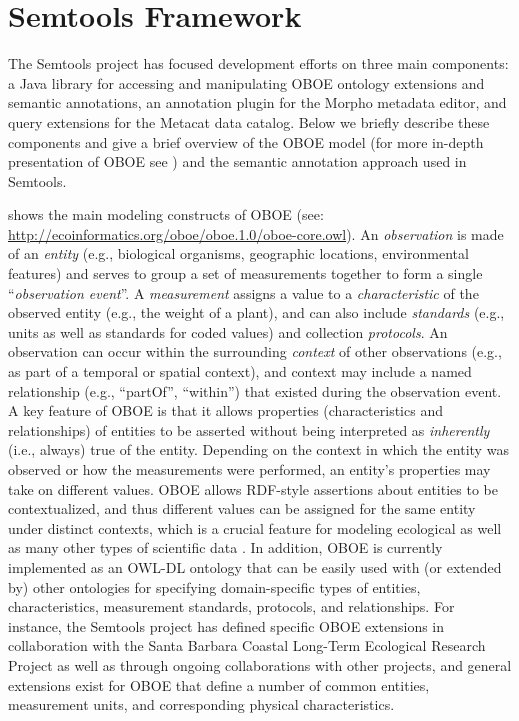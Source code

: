 \section{Semtools Framework}
\label{sec:framework}

The Semtools project has focused development efforts on three main
components: a Java library for accessing and manipulating OBOE
ontology extensions and semantic annotations, an annotation plugin for
the Morpho metadata editor, and query extensions for the Metacat data
catalog. Below we briefly describe these components and give a brief
overview of the OBOE model (for more in-depth presentation of OBOE see
\cite{madin07:_ontol_for_descr_and_synth,bowers08}) and the semantic
annotation approach used in Semtools.


   shows the
main modeling constructs of OBOE (see:
\url{http://ecoinformatics.org/oboe/oboe.1.0/oboe-core.owl}). An {\em
  observation} is made of an {\em entity} (e.g., biological organisms,
geographic locations, environmental features) and serves to group a
set of measurements together to form a single ``\emph{observation
  event}''. A \emph{measurement} assigns a value to a {\em
  characteristic} of the observed entity (e.g., the weight of a
plant), and can also include \emph{standards} (e.g., units as well as
standards for coded values) and collection \emph{protocols}. An
observation can occur within the surrounding \emph{context} of other
observations (e.g., as part of a temporal or spatial context), and
context may include a named relationship (e.g., ``partOf'',
``within'') that existed during the observation event. A key feature
of OBOE is that it allows properties (characteristics and
relationships) of entities to be asserted without being interpreted as
\emph{inherently} (i.e., {always}) true of the entity.  Depending on
the context in which the entity was observed or how the measurements
were performed, an entity's properties may take on different values.
OBOE allows RDF-style assertions about entities to be contextualized,
and thus different values can be assigned for the same entity under
distinct contexts, which is a crucial feature for modeling ecological
as well as many other types of scientific data
\cite{bowers08,mungall07:_repres_phenot_in_owl}. In addition, OBOE is
currently implemented as an OWL-DL ontology that can be easily used
with (or extended by) other ontologies for specifying domain-specific
types of entities, characteristics, measurement standards, protocols,
and relationships. For instance, the Semtools project has defined
specific OBOE extensions in collaboration with the Santa Barbara
Coastal Long-Term Ecological Research Project as well as through
ongoing collaborations with other projects, and general extensions
exist for OBOE that define a number of common entities, measurement
units, and corresponding physical characteristics.

